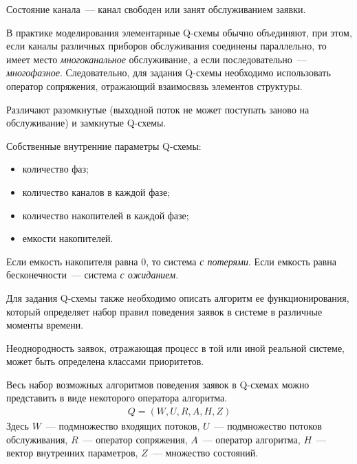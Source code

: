Состояние канала~--- канал свободен или занят обслуживанием заявки.

В практике моделирования элементарные Q-схемы обычно объединяют, при этом, если каналы различных приборов обслуживания соединены параллельно, то имеет место \textit{многоканальное} обслуживание, а если последовательно~--- \textit{многофазное}. Следовательно, для задания Q-схемы необходимо использовать оператор сопряжения, отражающий взаимосвязь элементов структуры.

Различают разомкнутые (выходной поток не может поступать заново на обслуживание) и замкнутые Q-схемы.

Собственные внутренние параметры Q-схемы:

\begin{itemize}
    \item количество фаз;
    \item количество каналов в каждой фазе;
    \item количество накопителей в каждой фазе;
    \item емкости накопителей.
\end{itemize}

Если емкость накопителя равна 0, то система \textit{с потерями}. Если емкость равна бесконечности~--- система \textit{с ожиданием}.

Для задания Q-схемы также необходимо описать алгоритм ее функционирования, который определяет набор правил поведения заявок в системе в различные моменты времени.

Неоднородность заявок, отражающая процесс в той или иной реальной системе, может быть определена классами приоритетов.

Весь набор возможных алгоритмов поведения заявок в Q-схемах можно представить в виде некоторого оператора алгоритма.
%
\begin{gather*}
    Q = (W, U, R, A, H, Z)
\end{gather*}
%
Здесь $W$~--- подмножество входящих потоков, $U$~--- подмножество потоков обслуживания, $R$~--- оператор сопряжения, $A$~--- оператор алгоритма, $H$~--- вектор внутренних параметров, $Z$~--- множество состояний.
